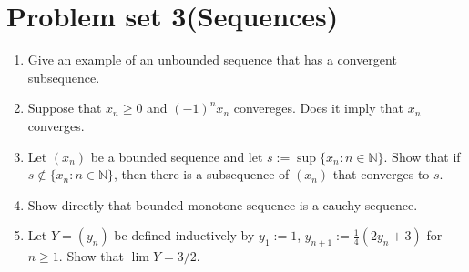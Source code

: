 \documentclass[12pt]{article}
\begin{document}
\newpage

\section{Problem set 3(Sequences)}
    \begin{enumerate}
        \item Give an example of an unbounded sequence that has a convergent subsequence.
        \item Suppose that $x_n\geq0$ and $(-1)^nx_n$ convereges. Does it imply that $x_n$ converges.
        \item Let $(x_n)$ be a bounded sequence and let $s := \sup\{x_n : n \in \mathbb{N}\}$. Show that if $s \notin \{x_n : n \in \mathbb{N}\}$, then there is a subsequence of $(x_n)$ that converges to $s$.
        \item Show directly that bounded monotone sequence is a cauchy sequence.
        \item Let $Y = (y_n)$ be defined inductively by $y_1 := 1$, $y_{n+1} := \frac{1}{4}(2y_n+3)$ for $n \ge 1$. Show that $\lim Y = 3/2$.
    \end{enumerate}
\end{document}
